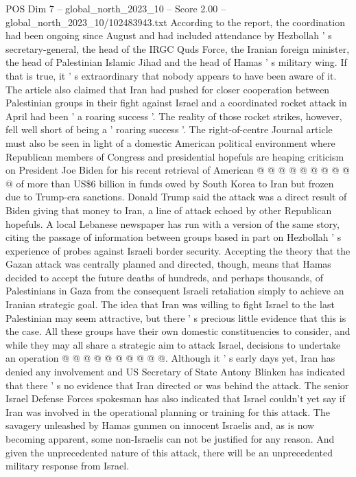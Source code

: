 \begin{textsample}{POS Dim 7 – global\_north\_2023\_10 – Score 2.00 – global\_north\_2023\_10/102483943.txt}
According to the report, the coordination had been ongoing since August and had included attendance by Hezbollah ' s secretary-general, the head of the IRGC Quds Force, the Iranian foreign minister, the head of Palestinian Islamic Jihad and the head of Hamas ' s military wing.
If that is true, it ' s extraordinary that nobody appears to have been aware of it.
The article also claimed that Iran had pushed for closer cooperation between Palestinian groups in their fight against Israel and a coordinated rocket attack in April had been ' a roaring success '.
The reality of those rocket strikes, however, fell well short of being a ' roaring success '.
The right-of-centre Journal article must also be seen in light of a domestic American political environment where Republican members of Congress and presidential hopefuls are heaping criticism on President Joe Biden for his recent retrieval of American @ @ @ @ @ @ @ @ @ @ of more than US\$6 billion in funds owed by South Korea to Iran but frozen due to Trump-era sanctions.
Donald Trump said the attack was a direct result of Biden giving that money to Iran, a line of attack echoed by other Republican hopefuls.
A local Lebanese newspaper has run with a version of the same story, citing the passage of information between groups based in part on Hezbollah ' s experience of probes against Israeli border security.
Accepting the theory that the Gazan attack was centrally planned and directed, though, means that Hamas decided to accept the future deaths of hundreds, and perhaps thousands, of Palestinians in Gaza from the consequent Israeli retaliation simply to achieve an Iranian strategic goal.
The idea that Iran was willing to fight Israel to the last Palestinian may seem attractive, but there ' s precious little evidence that this is the case.
All these groups have their own domestic constituencies to consider, and while they may all share a strategic aim to attack Israel, decisions to undertake an operation @ @ @ @ @ @ @ @ @ @.
Although it ' s early days yet, Iran has denied any involvement and US Secretary of State Antony Blinken has indicated that there ' s no evidence that Iran directed or was behind the attack.
The senior Israel Defense Forces spokesman has also indicated that Israel couldn't yet say if Iran was involved in the operational planning or training for this attack.
The savagery unleashed by Hamas gunmen on innocent Israelis and, as is now becoming apparent, some non-Israelis can not be justified for any reason.
And given the unprecedented nature of this attack, there will be an unprecedented military response from Israel.

\end{textsample}
